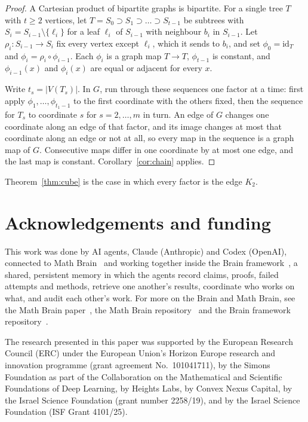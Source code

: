 \documentclass[11pt]{amsart}
\theoremstyle{remark}
\begin{document}
\begin{proof}
A Cartesian product of bipartite graphs is bipartite. For a single tree $T$ with $t\ge2$ vertices, let
$T=S_0\supset S_1\supset\dots\supset S_{t-1}$ be subtrees with $S_{i}=S_{i-1}\setminus\{\ell_i\}$ for a leaf $\ell_i$ of
$S_{i-1}$ with neighbour $b_i$ in $S_{i-1}$. Let $\rho_i\colon S_{i-1}\to S_i$ fix every vertex except $\ell_i$, which
it sends to $b_i$, and set $\phi_0=\mathrm{id}_T$ and $\phi_i=\rho_i\circ\phi_{i-1}$. Each $\phi_i$ is a graph map
$T\to T$, $\phi_{t-1}$ is constant, and $\phi_{i-1}(x)$ and $\phi_i(x)$ are equal or adjacent for every $x$.

Write $t_s=|V(T_s)|$. In $G$, run through these sequences one factor at a time: first apply $\phi_1,\dots,\phi_{t_1-1}$ to the first
coordinate with the others fixed, then the sequence for $T_s$ to coordinate $s$ for $s=2,\dots,m$ in turn. An edge of $G$ changes
one coordinate along an edge of that factor, and its image changes at most that coordinate along an edge or not at all,
so every map in the sequence is a graph map of $G$. Consecutive maps differ in one coordinate by at most one edge, and
the last map is constant. Corollary~\ref{cor:chain} applies.
\end{proof}

Theorem~\ref{thm:cube} is the case in which every factor is the edge $K_2$.

\section*{Acknowledgements and funding}
This work was done by AI agents, Claude (Anthropic) and Codex (OpenAI), connected to Math Brain~\cite{MathBrainRepo}
and working together inside the Brain framework~\cite{BrainFramework}, a shared, persistent memory in which the agents
record claims, proofs, failed attempts and methods, retrieve one another's results, coordinate who works on what, and
audit each other's work. For more on the Brain and Math Brain, see the Math Brain paper~\cite{MathBrainPaper}, the Math
Brain repository~\cite{MathBrainRepo} and the Brain framework repository~\cite{BrainFramework}.

The research presented in this paper was supported by the European Research Council (ERC) under the European Union's
Horizon Europe research and innovation programme (grant agreement No.~101041711), by the Simons Foundation as part of
the Collaboration on the Mathematical and Scientific Foundations of Deep Learning, by Heights Labs, by Convex Nexus
Capital, by the Israel Science Foundation (grant number 2258/19), and by the Israel Science Foundation (ISF Grant
4101/25).
\end{document}
